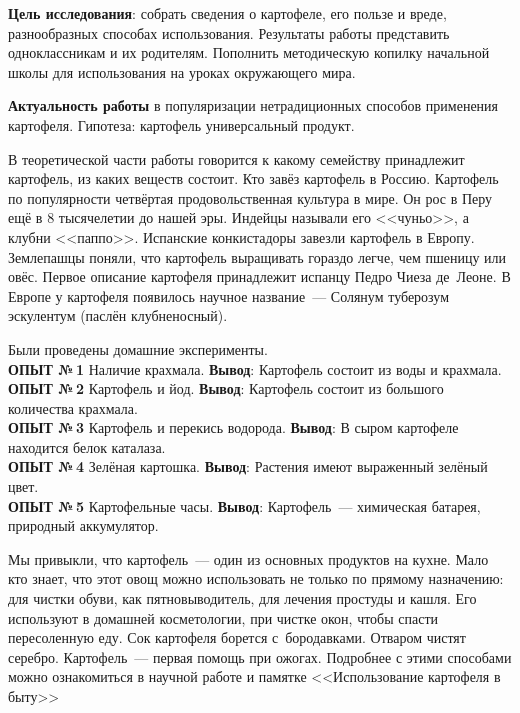 


\makeProcTitleSchool


\textbf{Цель исследования}: собрать сведения о картофеле, его пользе и вреде, разнообразных способах использования. Результаты работы представить одноклассникам и их родителям. Пополнить методическую копилку начальной школы для использования на уроках окружающего мира.

\textbf{Актуальность работы} в популяризации нетрадиционных способов применения картофеля. Гипотеза: картофель универсальный продукт.

В теоретической части работы говорится к какому семейству принадлежит картофель, из каких веществ состоит.	Кто завёз картофель в Россию. Картофель по популярности четвёртая продовольственная культура в мире. Он рос в Перу ещё в 8 тысячелетии до нашей эры. Индейцы называли его <<чуньо>>, а клубни <<паппо>>. Испанские конкистадоры завезли картофель в Европу.  Землепашцы поняли, что картофель выращивать гораздо легче, чем пшеницу или овёс. Первое описание картофеля принадлежит испанцу Педро Чиеза де~Леоне.  В Европе у картофеля появилось научное название~--- Солянум туберозум эскулентум (паслён клубненосный).

Были проведены домашние эксперименты.\\
\textbf{ОПЫТ №\,1} Наличие крахмала. \textbf{Вывод}: Картофель состоит из воды и крахмала.\\
\textbf{ОПЫТ №\,2} Картофель и йод. \textbf{Вывод}: Картофель состоит из большого количества крахмала.\\
\textbf{ОПЫТ №\,3} Картофель и перекись водорода. \textbf{Вывод}: В сыром картофеле находится белок каталаза.\enlargethispage{2\baselineskip}\\
\textbf{ОПЫТ №\,4} Зелёная картошка. \textbf{Вывод}: Растения имеют выраженный зелёный цвет.\\
\textbf{ОПЫТ №\,5} Картофельные часы.	\textbf{Вывод}: Картофель~--- химическая батарея, природный  аккумулятор.

Мы привыкли, что картофель~--- один из основных продуктов на кухне. Мало кто знает, что этот овощ можно использовать не только по прямому назначению: для чистки обуви, как пятновыводитель, для лечения простуды и кашля. Его используют в домашней косметологии, при чистке окон, чтобы спасти пересоленную еду. Сок картофеля борется с~бородавками. Отваром чистят серебро. Картофель~--- первая помощь при ожогах. Подробнее с этими способами можно ознакомиться в научной работе и памятке <<Использование картофеля в быту>>

